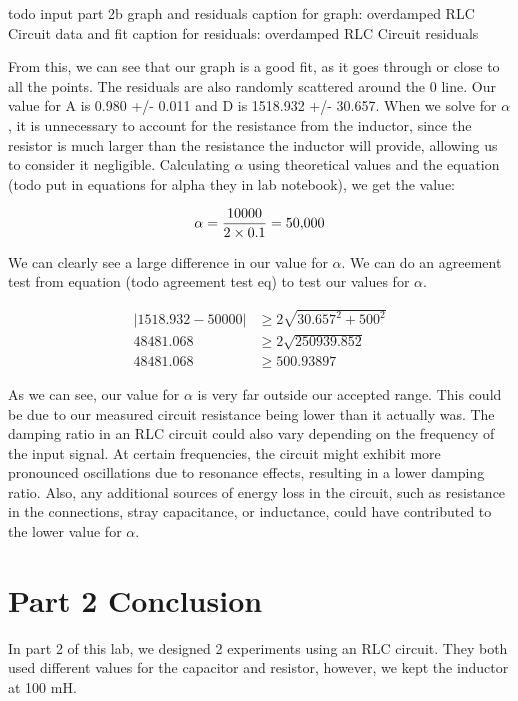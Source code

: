 \documentclass[11pt]{article}
\let\oldsection\section
\renewcommand\section{\clearpage\oldsection}
\begin{document}
    todo input part 2b graph and residuals
    caption for graph: overdamped RLC Circuit data and fit
    caption for residuals: overdamped RLC Circuit residuals

    From this, we can see that our graph is a good fit, as it goes through or close to all the points. The residuals are also randomly scattered around the 0 line. Our value for A is 0.980 +/- 0.011 and D is 1518.932 +/- 30.657. When we solve for \( \alpha \), it is unnecessary to account for the resistance from the inductor, since the resistor is much larger than the resistance the inductor will provide, allowing us to consider it negligible. Calculating \( \alpha \) using theoretical values and the equation (todo put in equations for alpha they in lab notebook), we get the value:

    \[
    \alpha = \frac{10000}{2 \times 0.1} \\ = 50{,}000
    \]

    We can clearly see a large difference in our value for \( \alpha \). We can do an agreement test from equation (todo agreement test eq) to test our values for \( \alpha \).

    \begin{e}
        \begin{align*}
            |1518.932 - 50000| &\ge 2 \sqrt{30.657^2 + 500^2} \\
            48481.068 &\ge 2 \sqrt{250939.852} \\
            48481.068 &\ge 500.93897
        \end{align*}
    \end{e}

    As we can see, our value for \( \alpha \) is very far outside our accepted range. This could be due to our measured circuit resistance being lower than it actually was. The damping ratio in an RLC circuit could also vary depending on the frequency of the input signal. At certain frequencies, the circuit might exhibit more pronounced oscillations due to resonance effects, resulting in a lower damping ratio. Also, any additional sources of energy loss in the circuit, such as resistance in the connections, stray capacitance, or inductance, could have contributed to the lower value for \( \alpha \).

    
    \section{Part 2 Conclusion}\label{sec:part2_conclusion}
    In part 2 of this lab, we designed 2 experiments using an RLC circuit. They both used different values for the capacitor and resistor, however, we kept the inductor at 100 mH. 
    
\end{document}
